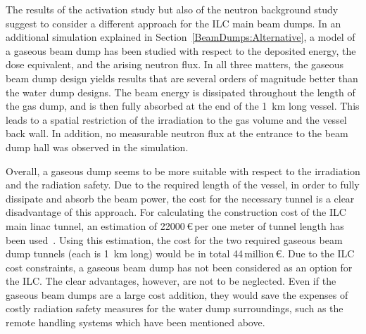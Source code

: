 The results of the activation study but also of the neutron background study suggest to consider a different approach for the ILC main beam dumps.
In an additional \fluka simulation explained in Section~\ref{BeamDumps:Alternative}, a model of a gaseous beam dump has been studied with respect to the deposited energy, the dose equivalent, and the arising neutron flux.
In all three matters, the gaseous beam dump design yields results that are several orders of magnitude better than the water dump designs.
The beam energy is dissipated throughout the length of the gas dump, and is then fully absorbed at the end of the \SI{1}{\kilo\meter} long vessel.
This leads to a spatial restriction of the irradiation to the gas volume and the vessel back wall.
In addition, no measurable neutron flux at the entrance to the beam dump hall was observed in the \fluka simulation.

Overall, a gaseous dump seems to be more suitable with respect to the irradiation and the radiation safety.
Due to the required length of the vessel, in order to fully dissipate and absorb the beam power, the cost for the necessary tunnel is a clear disadvantage of this approach.
For calculating the construction cost of the ILC main linac tunnel, an estimation of \num{22000}\,\euro\,per one meter of tunnel length has been used~\cite{TunnelCost}.
Using this estimation, the cost for the two required gaseous beam dump tunnels (each is \SI{1}{\kilo\meter} long) would be in total \num{44}\,million\,\euro.
Due to the ILC cost constraints, a gaseous beam dump has not been considered as an option for the ILC.
The clear advantages, however, are not to be neglected.
Even if the gaseous beam dumps are a large cost addition, they would save the expenses of costly radiation safety measures for the water dump surroundings, such as the remote handling systems which have been mentioned above.